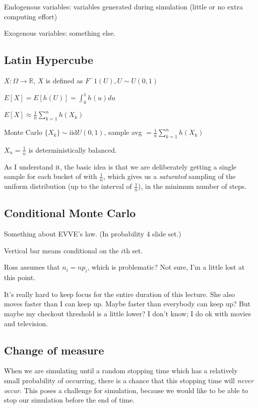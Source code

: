 \documentclass{article}
\begin{document}
Endogenous variables: variables generated during simulation (little or
no extra computing effort)

Exogenous variables: something else.

\subsection{Latin Hypercube}

$X: \Omega \to \mathbb R$, $X$ is defined as $F^-1(U), U \sim U(0,1)$

$E[X] = E[h(U)] = \int_0^1 h(u)du$

$E[X] \approx \frac{1}{n}\sum_{k=1}^n h(X_k)$

Monte Carlo $\{X_k\} \sim \text{iid} U(0,1)$, sample avg $=
\frac{1}{n}\sum_{k=1}^n h(X_k)$

$X_n = \frac{1}{n}$ is deterministically balanced.

As I understand it, the basic idea is that we are deliberately getting a
single sample for each bucket of with $\frac{1}{n}$, which gives us a
\emph{saturated} sampling of the uniform distribution (up to the
interval of $\frac{1}{n}$), in the minimum number of steps.

\subsection{Conditional Monte Carlo}

Something about EVVE's law. (In probability 4 slide set.)

Vertical bar means conditional on the $i$th set.

Ross assumes that $n_i = np_i$, which is problematic? Not sure, I'm a
little lost at this point.

It's really hard to keep focus for the entire duration of this lecture.
She also moves faster than I can keep up. Maybe faster than everybody
can keep up? But maybe my checkout threshold is a little lower? I don't
know; I do ok with movies and television.

\subsection{Change of measure}

When we are simulating until a random stopping time which has a
relatively small probability of occurring, there is a chance that this
stopping time will \emph{never occur}. This poses a challenge for
simulation, because we would like to be able to stop our simulation
before the end of time.
\end{document}
